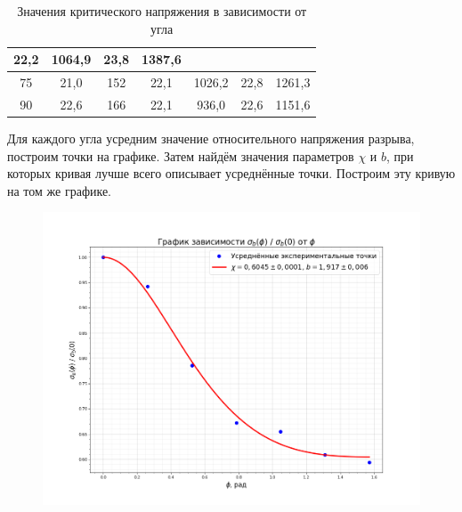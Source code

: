 \documentclass[a4paper,12pt]{article}
\begin{document}
\begin{table}[H]
\begin{tabular}{|c|cc|cc|cc|}
          \multicolumn{1}{c|}{{\color[HTML]{000000} 22,2}} &
          {\color[HTML]{000000} 1064,9} &
          \multicolumn{1}{c|}{{\color[HTML]{000000} 23,8}} &
          {\color[HTML]{000000} 1387,6} \\ \hline
        {\color[HTML]{000000} 75} &
          \multicolumn{1}{c|}{{\color[HTML]{000000} 21,0}} &
          {\color[HTML]{000000} 152} &
          \multicolumn{1}{c|}{{\color[HTML]{000000} 22,1}} &
          {\color[HTML]{000000} 1026,2} &
          \multicolumn{1}{c|}{{\color[HTML]{000000} 22,8}} &
          {\color[HTML]{000000} 1261,3} \\ \hline
        {\color[HTML]{000000} 90} &
          \multicolumn{1}{c|}{{\color[HTML]{000000} 22,6}} &
          {\color[HTML]{000000} 166} &
          \multicolumn{1}{c|}{{\color[HTML]{000000} 22,1}} &
          {\color[HTML]{000000} 936,0} &
          \multicolumn{1}{c|}{{\color[HTML]{000000} 22,6}} &
          {\color[HTML]{000000} 1151,6} \\ \hline
    \end{tabular}
    \caption{Значения критического напряжения в зависимости от угла}
\end{table}
Для каждого угла усредним значение относительного напряжения разрыва, построим точки на графике. Затем найдём значения параметров $\chi$ и $b$, при которых кривая лучше всего описывает усреднённые точки. Построим эту кривую на том же графике.

\begin{figure}[H]\label{fig: Graph sigma / sigma (phi)}
    \centering
    \includegraphics[width = \textwidth]{Финальный график.png}
\end{figure}

\end{document}
